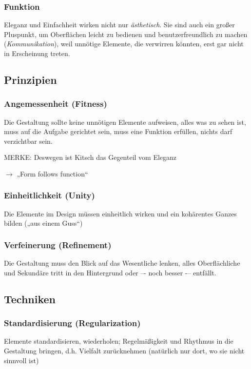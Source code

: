 \subsubsection*{Funktion}
Eleganz und Einfachheit wirken nicht nur \emph{ästhetisch}. Sie sind auch ein großer Pluspunkt, um Oberflächen leicht zu bedienen und benutzerfreundlich zu machen (\emph{Kommunikation}), weil unnötige Elemente, die verwirren könnten, erst gar nicht in Erscheinung treten.

\subsection{Prinzipien}
\subsubsection*{Angemessenheit (Fitness)}
Die Gestaltung sollte keine unnötigen Elemente aufweisen, alles was zu sehen ist, muss auf die Aufgabe gerichtet sein, muss eine Funktion erfüllen, nichts darf verzichtbar sein. 

MERKE: Deswegen ist Kitsch das Gegenteil vom Eleganz

$\to$ „Form follows function“
 
\subsubsection*{Einheitlichkeit (Unity)}
Die Elemente im Design müssen einheitlich wirken und ein kohärentes Ganzes bilden („aus einem Guss“)
 
\subsubsection*{Verfeinerung (Refinement)}
Die Gestaltung muss den Blick auf das Wesentliche lenken, alles Oberflächliche und Sekundäre tritt in den Hintergrund oder –- noch besser -– entfällt.

\subsection{Techniken}
\subsubsection*{Standardisierung (Regularization)}
Elemente standardisieren, wiederholen; Regelmäßigkeit und Rhythmus in die Gestaltung bringen, d.h. Vielfalt  zurücknehmen (natürlich nur dort, wo sie nicht sinnvoll ist)

